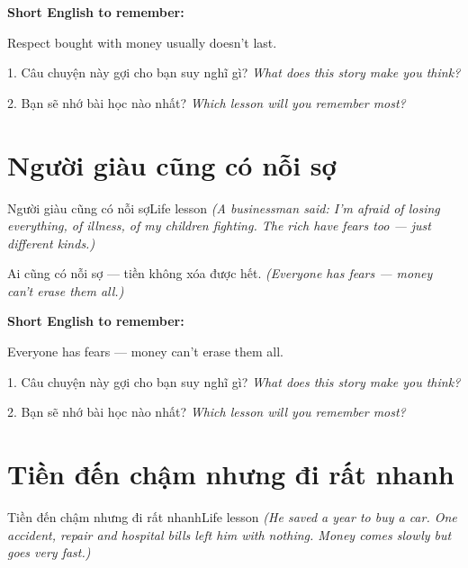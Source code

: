 \begin{ghinhoanh}
\textbf{Short English to remember:}

Respect bought with money usually doesn't last.

\end{ghinhoanh}

\begin{tuhocnhanh}
1. Câu chuyện này gợi cho bạn suy nghĩ gì? \textit{What does this story make you think?}

2. Bạn sẽ nhớ bài học nào nhất? \textit{Which lesson will you remember most?}
\end{tuhocnhanh}
\ngancach


\section{Người giàu cũng có nỗi sợ}
\begin{truyen}{Người giàu cũng có nỗi sợ}{Life lesson}
\textit{(A businessman said: I'm afraid of losing everything, of illness, of my children fighting. The rich have fears too — just different kinds.)}
\end{truyen}

\begin{baihoc}
Ai cũng có nỗi sợ — tiền không xóa được hết.
\textit{(Everyone has fears — money can't erase them all.)}
\end{baihoc}

\begin{ghinhoanh}
\textbf{Short English to remember:}

Everyone has fears — money can't erase them all.

\end{ghinhoanh}

\begin{tuhocnhanh}
1. Câu chuyện này gợi cho bạn suy nghĩ gì? \textit{What does this story make you think?}

2. Bạn sẽ nhớ bài học nào nhất? \textit{Which lesson will you remember most?}
\end{tuhocnhanh}
\ngancach


\section{Tiền đến chậm nhưng đi rất nhanh}
\begin{truyen}{Tiền đến chậm nhưng đi rất nhanh}{Life lesson}
\textit{(He saved a year to buy a car. One accident, repair and hospital bills left him with nothing. Money comes slowly but goes very fast.)}
\end{truyen}

